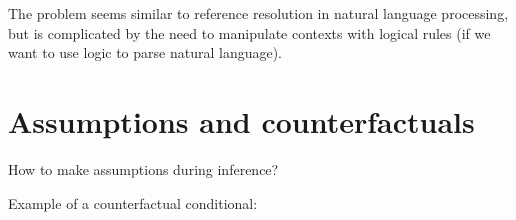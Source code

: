 The problem seems similar to reference resolution in natural language processing, but is complicated by the need to manipulate contexts with logical rules (if we want to use logic to parse natural language).

\underconst

\section{Assumptions and counterfactuals}

How to make assumptions during inference?  

Example of a counterfactual conditional:  
